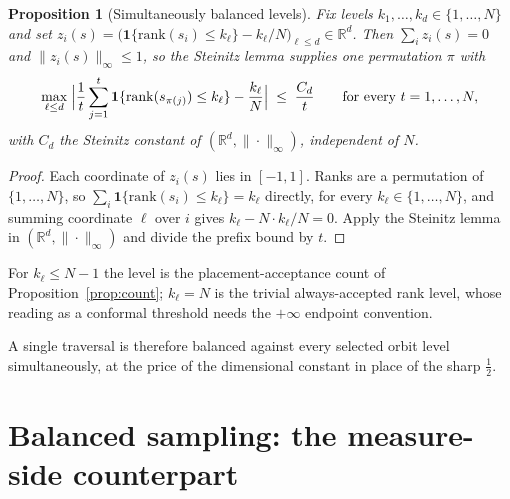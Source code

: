 \documentclass[11pt]{article}
\newtheorem{proposition}{Proposition}
\theoremstyle{remark}
\newcommand{\R}{\mathbb{R}}
\newcommand{\ind}[1]{\mathbf 1\{#1\}}
\begin{document}
\begin{proposition}[Simultaneously balanced levels]\label{prop:multilevel}
Fix levels $k_1,\dots,k_d\in\{1,\dots,N\}$ and set
$z_i(s)=\bigl(\ind{\mathrm{rank}(s_i)\le k_\ell}-k_\ell/N\bigr)_{\ell\le d}\in\R^{d}$. Then
$\sum_i z_i(s)=0$ and $\|z_i(s)\|_\infty\le 1$, so the Steinitz lemma supplies one permutation
$\pi$ with
\[
\max_{\ell\le d}\;\Bigl|\frac1t\sum_{j=1}^{t}\ind{\mathrm{rank}(s_{\pi(j)})\le k_\ell}
-\frac{k_\ell}{N}\Bigr|\;\le\;\frac{C_d}{t}
\qquad\text{for every } t=1,\dots,N,
\]
with $C_d$ the Steinitz constant of $(\R^d,\|\cdot\|_\infty)$, independent of $N$.
\end{proposition}

\begin{proof}
Each coordinate of $z_i(s)$ lies in $[-1,1]$. Ranks are a permutation of $\{1,\dots,N\}$, so
$\sum_i\ind{\mathrm{rank}(s_i)\le k_\ell}=k_\ell$ directly, for every
$k_\ell\in\{1,\dots,N\}$, and summing coordinate $\ell$ over $i$ gives $k_\ell-N\cdot
k_\ell/N=0$. Apply the Steinitz lemma in $(\R^d,\|\cdot\|_\infty)$ and divide the prefix bound
by $t$.
\end{proof}

For $k_\ell\le N-1$ the level is the placement-acceptance count of
Proposition~\ref{prop:count}; $k_\ell=N$ is the trivial always-accepted rank level, whose
reading as a conformal threshold needs the $+\infty$ endpoint convention.

A single traversal is therefore balanced against every selected orbit level simultaneously, at
the price of the dimensional constant in place of the sharp $\tfrac12$.

\section{Balanced sampling: the measure-side counterpart}\label{sec:cubature}
\end{document}
